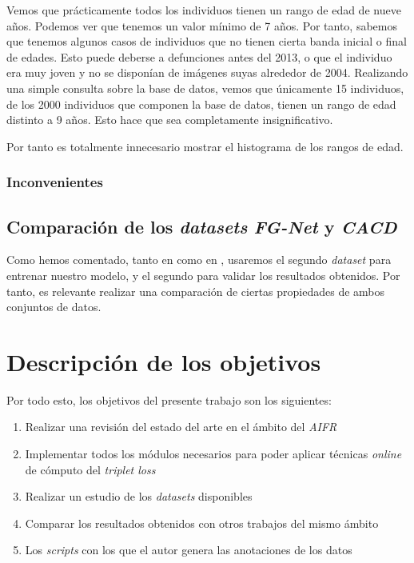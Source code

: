 Vemos que prácticamente todos los individuos tienen un rango de edad de nueve años. Podemos ver que tenemos un valor mínimo de 7 años. Por tanto, sabemos que tenemos algunos casos de individuos que no tienen cierta banda inicial o final de edades. Esto puede deberse a defunciones antes del 2013, o que el individuo era muy joven y no se disponían de imágenes suyas alrededor de 2004. Realizando una simple consulta sobre la base de datos, vemos que únicamente 15 individuos, de los 2000 individuos que componen la base de datos, tienen un rango de edad distinto a 9 años. Esto hace que sea completamente insignificativo.

Por tanto es totalmente innecesario mostrar el histograma de los rangos de edad.

\subsubsection{Inconvenientes}


\subsection{Comparación de los \textit{datasets} \textit{FG-Net} y \textit{CACD}} \label{isec:comparaciones_datasets}

Como hemos comentado, tanto en  como en , usaremos el segundo \textit{dataset} para entrenar nuestro modelo, y el segundo para validar los resultados obtenidos. Por tanto, es relevante realizar una comparación de ciertas propiedades de ambos conjuntos de datos.

\section{Descripción de los objetivos}

Por todo esto, los objetivos del presente trabajo son los siguientes:

\begin{enumerate}
    \item Realizar una revisión del estado del arte en el ámbito del \textit{AIFR}
    \item Implementar todos los módulos necesarios para poder aplicar técnicas \textit{online} de cómputo del \textit{triplet loss}
    \item Realizar un estudio de los \textit{datasets} disponibles
    \item Comparar los resultados obtenidos con otros trabajos del mismo ámbito
    \item Los \textit{scripts} con los que el autor genera las anotaciones de los datos
\end{enumerate}

